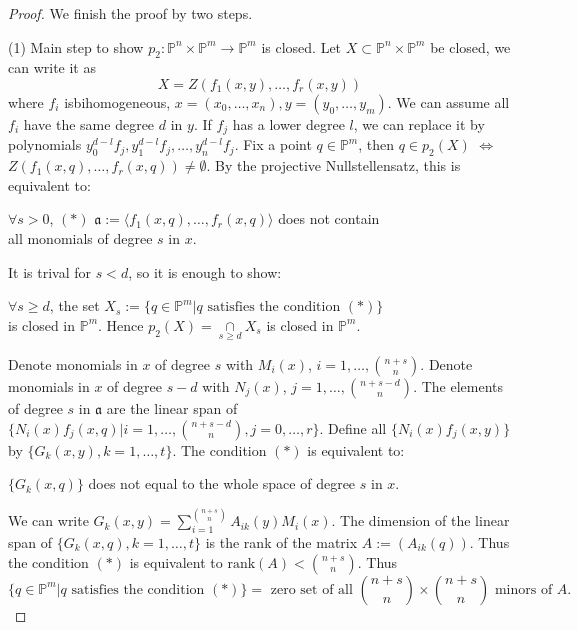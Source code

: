 \documentclass{amsart}
\theoremstyle{plain}
\theoremstyle{definition}
\theoremstyle{remark}
\numberwithin{equation}{section}
\begin{document}
\begin{proof}
	We finish the proof by two steps.
	
	(1) Main step to show $ p_2:\mathbb{P}^n\times \mathbb{P}^m\to \mathbb{P}^m $ is closed. Let $ X\subset\mathbb{P}^n\times\mathbb{P}^m $ be closed, we can write it as
	\begin{equation*}
		X=Z(f_1(x,y),\dots,f_r(x,y)) 
	\end{equation*} 
	where $ f_i $ isbihomogeneous, $ x=(x_0,\dots,x_n),y=(y_0,\dots,y_m) $. We can assume all $ f_i $ have the same degree $ d $ in $ y $. If $ f_j $ has a lower degree $ l $, we can replace it by polynomials $ y_0^{d-l}f_j,y_1^{d-l}f_j,\dots,y_n^{d-l}f_j $. Fix a point $ q\in\mathbb{P}^m $, then $ q\in p_2(X) $ $ \Leftrightarrow $ $ Z(f_1(x,q),\dots,f_r(x,q))\neq \emptyset $. By the projective Nullstellensatz, this is equivalent to: 
	\begin{center}
		$ \forall s>0 $, $ (\ast) $ $ \mathfrak{a}:=\langle f_1(x,q),\dots,f_r(x,q)\rangle $ does not contain\\
		 all monomials of degree $ s $ in $ x $.
	\end{center} 
	It is trival for $ s<d $, so it is enough to show:
	\begin{center}
		$ \forall s\geq d $, the set $X_s:= \{ q\in\mathbb{P}^m|q \text{ satisfies the condition } (\ast) \} $ \\
		is closed in $ \mathbb{P}^m $.
		 Hence $ p_2(X)=\mathop{\cap}\limits_{s\geq d} X_s $ is closed in $ \mathbb{P}^m $.
	\end{center}
	Denote monomials in $ x $ of degree $ s $ with $ M_i(x) $, $ i=1,\dots,\binom{n+s}{n} $. Denote monomials in $ x $ of degree $ s-d $ with $ N_j(x) $, $ j=1,\dots,\binom{n+s-d}{n} $. The elements of degree $ s $ in $ \mathfrak{a} $ are the linear span of $ \{N_i(x)f_j(x,q)|i=1,\dots,\binom{n+s-d}{n},j=0,\dots,r\} $. Define all  $ \{N_i(x)f_j(x,y)\} $ by $ \{ G_k(x,y),k=1,\dots,t \} $. The condition $ (\ast) $ is equivalent to:
	\begin{center}
		$ \{ G_k(x,q) \} $ does not equal to the whole space of degree $ s $ in $ x $.
	\end{center}
	We can write $ G_k(x,y)=\sum\limits_{i=1}^{\binom{n+s}{n}} A_{ik}(y)M_i(x) $. The dimension of the linear span of $ \{G_k(x,q),k=1,\dots,t \}$ is the rank of the matrix $ A:=(A_{ik}(q)) $. Thus the condition $ (\ast) $ is equivalent to $ \text{rank}(A)<\binom{n+s}{n} $. Thus 
	\begin{equation*}
		\{q\in\mathbb{P}^m|q \text{ satisfies the condition } (\ast) \}=\text{ zero set of all } \binom{n+s}{n}\times \binom{n+s}{n} \text{ minors of } A.

\end{equation*}
\end{proof}
\end{document}

